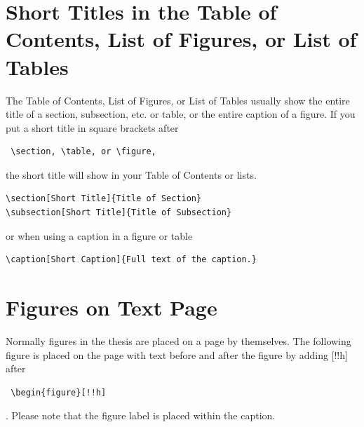 \section[Short Titles]{Short Titles in the Table of Contents, List of Figures, or List of Tables}

The Table of Contents, List of Figures, or List of Tables usually show the entire title of a section, subsection, etc. or table, or the entire caption of a figure.  If you put a short title in square brackets after \begin{verbatim} \section, \table, or \figure, \end{verbatim} the short title will show in your Table of Contents or lists.

\renewcommand{\baselinestretch}{1}
\small\normalsize

\begin{verbatim}
\section[Short Title]{Title of Section} 
\subsection[Short Title]{Title of Subsection} 
\end{verbatim}

or when using a caption in a figure or table
\begin{verbatim}
\caption[Short Caption]{Full text of the caption.}
\end{verbatim}

\renewcommand{\baselinestretch}{2}
\small\normalsize


\section{Figures on Text Page}

Normally figures in the thesis are placed on a page by themselves.  The following figure is placed on the page with text before and after the figure by adding [!!h] after \begin{verbatim} \begin{figure}[!!h] \end{verbatim}.  Please note that the figure label is placed within the caption.

